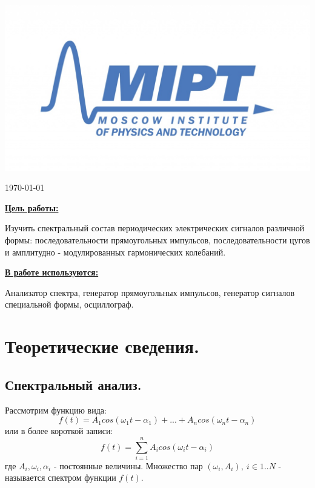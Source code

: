 \documentclass[a4paper, 12pt,twoside]{article}
\newenvironment{bottompar}{\par\vspace*{\fill}}{\clearpage}
\begin{document}
\begin{titlepage}
\begin{bottompar}
	\begin{center}
		\includegraphics[width = 80 mm]{logo.jpg}
	\end{center}
	{\large \today}

\end{bottompar}
\vfill %

\end{titlepage}


{\Large \uline { \textbf  {Цель работы:}}}

\vspace{2mm}

Изучить спектральный состав периодических электрических сигналов различной формы: последовательности прямоугольных импульсов, последовательности цугов и амплитудно - модулированных гармонических колебаний.

\vspace{\baselineskip}

{\Large \uline { \textbf  {В работе используются:}}}

\vspace{2mm}

Анализатор спектра, генератор прямоугольных импульсов, генератор сигналов специальной формы, осциллограф.

\section{Теоретические сведения.}

\subsection{Спектральный анализ.}

Рассмотрим функцию вида:
$$f(t) = A_{1}cos(\omega_1t-\alpha_{1}) + ... + A_{n}cos(\omega_{n}t-\alpha_{n})$$
или в более короткой записи:
$$f(t) = \sum\limits_{i=1}^n A_{i}cos(\omega_{i}t-\alpha_{i})$$
где $A_{i}, \omega_{i}, \alpha_{i}$ - постоянные величины. Множество пар $(\omega_{i}, A_{i}), \: i \in 1..N$ - называется спектром функции $f(t)$.
\end{document}
